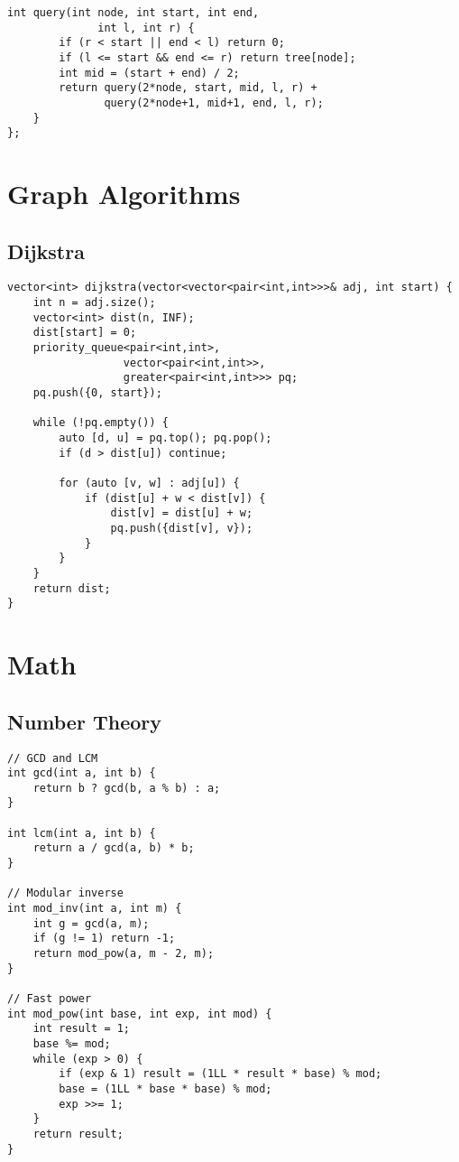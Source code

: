 \documentclass[10pt]{article}
\begin{document}
\begin{landscape}
\begin{multicols}{2}
\begin{lstlisting}[style=cpp]
    int query(int node, int start, int end, 
              int l, int r) {
        if (r < start || end < l) return 0;
        if (l <= start && end <= r) return tree[node];
        int mid = (start + end) / 2;
        return query(2*node, start, mid, l, r) + 
               query(2*node+1, mid+1, end, l, r);
    }
};
\end{lstlisting}

\section{Graph Algorithms}
\subsection{Dijkstra}
\begin{lstlisting}[style=cpp]
vector<int> dijkstra(vector<vector<pair<int,int>>>& adj, int start) {
    int n = adj.size();
    vector<int> dist(n, INF);
    dist[start] = 0;
    priority_queue<pair<int,int>, 
                  vector<pair<int,int>>,
                  greater<pair<int,int>>> pq;
    pq.push({0, start});
    
    while (!pq.empty()) {
        auto [d, u] = pq.top(); pq.pop();
        if (d > dist[u]) continue;
        
        for (auto [v, w] : adj[u]) {
            if (dist[u] + w < dist[v]) {
                dist[v] = dist[u] + w;
                pq.push({dist[v], v});
            }
        }
    }
    return dist;
}
\end{lstlisting}

\section{Math}
\subsection{Number Theory}
\begin{lstlisting}[style=cpp]
// GCD and LCM
int gcd(int a, int b) {
    return b ? gcd(b, a % b) : a;
}

int lcm(int a, int b) {
    return a / gcd(a, b) * b;
}

// Modular inverse
int mod_inv(int a, int m) {
    int g = gcd(a, m);
    if (g != 1) return -1;
    return mod_pow(a, m - 2, m);
}

// Fast power
int mod_pow(int base, int exp, int mod) {
    int result = 1;
    base %= mod;
    while (exp > 0) {
        if (exp & 1) result = (1LL * result * base) % mod;
        base = (1LL * base * base) % mod;
        exp >>= 1;
    }
    return result;
}
\end{lstlisting}


\end{multicols}
\end{landscape}
\end{document}
